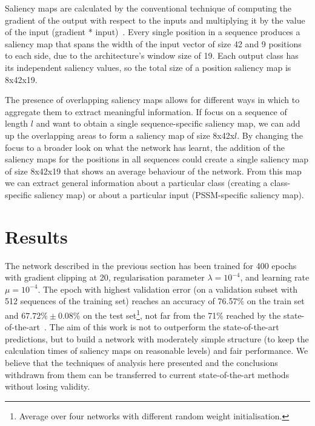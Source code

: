 \documentclass{article}
\begin{document}
Saliency maps are calculated by the conventional technique of computing the gradient of the output with respect to the inputs and multiplying it by the value of the input (gradient * input)~\cite{Shrikumar2016}. Every single position in a sequence produces a saliency map that spans the width of the input vector of size 42 and 9 positions to each side, due to the architecture's window size of 19. Each output class has its independent saliency values, so the total size of a position saliency map is 8x42x19.

The presence of overlapping saliency maps allows for different ways in which to aggregate them to extract meaningful information. If focus on a sequence of length $l$ and want to obtain a single sequence-specific saliency map, we can add up the overlapping areas to form a saliency map of size 8x42x$l$. By changing the focus to a broader look on what the network has learnt, the addition of the saliency maps for the positions in all sequences could create a single saliency map of size 8x42x19 that shows an average behaviour of the network. From this map we can extract general information about a particular class (creating a class-specific saliency map) or about a particular input (PSSM-specific saliency map).

\section{Results}
\label{sec:results}

The network described in the previous section has been trained for 400 epochs with gradient clipping at 20, regularisation parameter $\lambda=10^{-4}$, and learning rate $\mu=10^{-4}$. The epoch with highest validation error (on a validation subset with 512 sequences of the training set) reaches an accuracy of 76.57\% on the train set and $67.72\%\pm0.08\%$ on the test set\footnote{Average over four networks with different random weight initialisation.}, not far from the 71\% reached by the state-of-the-art~\cite{Busia2017}. The aim of this work is not to outperform the state-of-the-art predictions, but to build a network with moderately simple structure (to keep the calculation times of saliency maps on reasonable levels) and fair performance. We believe that the techniques of analysis here presented and the conclusions withdrawn from them can be transferred to current state-of-the-art methods without losing validity.
\end{document}
